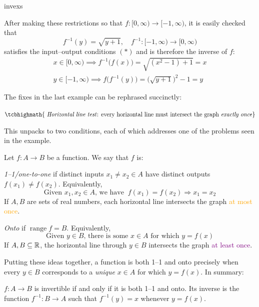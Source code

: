 \begin{examples}{}{invexs}
\begin{enumerate}
		\medbreak	
		After making these restrictions so that $f:[0,\infty)\to [-1,\infty)$, it is easily checked that
		\[
			f^{-1}(y)=\sqrt{y+1},\quad f^{-1}:[-1,\infty)\to[0,\infty)
		\]
		satisfies the input--output conditions $(\ast)$ and is therefore the inverse of $f$:
		\begin{gather*}
			x\in [0,\infty)\implies f^{-1}\bigl(f(x)\bigr) =\sqrt{(x^2-1)+1}=x\\
			y\in[-1,\infty)\implies f\bigl(f^{-1}(y)\bigr)=\bigl(\sqrt{y+1}\bigr)^2-1=y
		\end{gather*}
	\end{enumerate}
\end{examples}



The fixes in the last example can be rephrased succinctly:
\begin{center}
$\tcbhighmath{\text{
\emph{Horizontal line test}: every horizontal line must intersect the graph \emph{exactly once}}}$
\end{center}
This unpacks to two conditions, each of which addresses one of the problems seen in the example.

\begin{defn}{}{}
Let $f:A\to B$ be a function. We say that $f$ is:
\begin{enumeratea}
\item \emph{1--1/one-to-one} if distinct inputs $x_1\neq x_2\in A$ have distinct outputs $f(x_1)\neq f(x_2)$. Equivalently,
  \[
  	\text{Given $x_1,x_2\in A$, we have }\ f(x_1)=f(x_2)\Longrightarrow x_1=x_2
  \]
  If $A,B$ are sets of real numbers, each horizontal line intersects the graph \textcolor{orange}{at most once}.
  \item \emph{Onto} if $\operatorname{range}f=B$. Equivalently,
  \[
  	\text{Given $y\in B$, there is some $x\in A$ for which $y=f(x)$}
  \]
  If $A,B\subseteq\mathbb{R}$, the horizontal line through $y\in B$ intersects the graph \textcolor{Purple}{at least once}.
\end{enumeratea}
\end{defn}

Putting these ideas together, a function is both 1--1 and onto precisely when every $y\in B$ corresponds to a \emph{unique} $x\in A$ for which $y=f(x)$. In summary:

\begin{thm}{}{}
	$f:A\to B$ is invertible if and only if it is both 1--1 and onto. Its inverse is the function $f^{-1}:B\to A$ such that $f^{-1}(y)=x$ whenever $y=f(x)$.
\end{thm}

